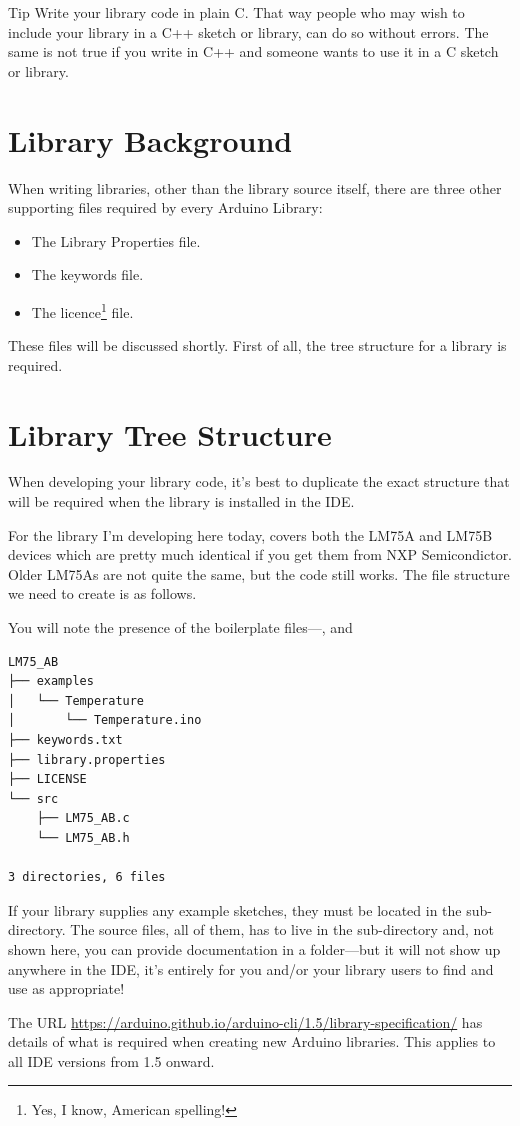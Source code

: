 \begin{tips}{Tip}
    Write your library code in plain C. That way people who may wish to include your library in a C++ sketch or library, can do so without errors. The same is not true if you write in C++ and someone wants to use it in a C sketch or library.
\end{tips}


\section{Library Background}

When writing libraries, other than the library source itself, there are three other supporting files required by every Arduino Library:

\begin{itemize}
    \item The Library Properties file.
    \item The keywords file.
    \item The licence\footnote{Yes, I know, American spelling!} file.
\end{itemize}

These files will be discussed shortly. First of all, the tree structure for a library is required.

\section{Library Tree Structure}

When developing your library code, it's best to duplicate the exact structure that will be required when the library is installed in the IDE.

For the library I'm developing here today,  covers both the LM75A and LM75B devices which are pretty much identical if you get them from NXP Semicondictor. Older LM75As are not quite the same, but the code still works. The file structure we need to create is as follows.

You will note the presence of the boilerplate files---,  and 

\begin{verbatim}
LM75_AB
├── examples
│   └── Temperature
│       └── Temperature.ino
├── keywords.txt
├── library.properties
├── LICENSE
└── src
    ├── LM75_AB.c
    └── LM75_AB.h

3 directories, 6 files
\end{verbatim}

If your library supplies any example sketches, they must be located in the  sub-directory. The source files, all of them, has to live in the  sub-directory and, not shown here, you can provide documentation in a  folder---but it will not show up anywhere in the IDE, it's entirely for you and/or your library users to find and use as appropriate!

The URL \url{https://arduino.github.io/arduino-cli/1.5/library-specification/} has details of what is required when creating new Arduino libraries. This applies to all IDE versions from 1.5 onward.

